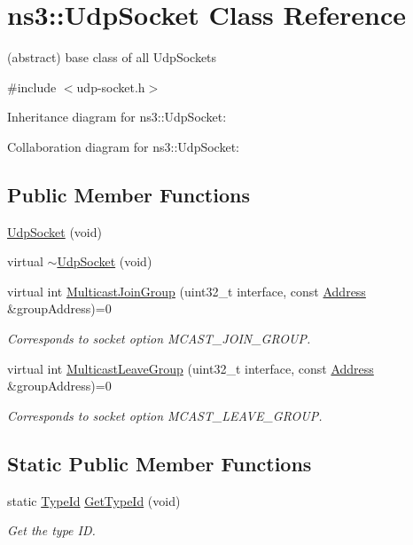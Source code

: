 \hypertarget{classns3_1_1UdpSocket}{}\section{ns3\+:\+:Udp\+Socket Class Reference}
\label{classns3_1_1UdpSocket}


(abstract) base class of all Udp\+Sockets  




{\ttfamily \#include $<$udp-\/socket.\+h$>$}



Inheritance diagram for ns3\+:\+:Udp\+Socket\+:


Collaboration diagram for ns3\+:\+:Udp\+Socket\+:
\subsection*{Public Member Functions}
\begin{DoxyCompactItemize}
\item 
\hyperlink{classns3_1_1UdpSocket_abbf25d1bcbd4a8d344c6266aa8c93bb5}{Udp\+Socket} (void)
\item 
virtual \hyperlink{classns3_1_1UdpSocket_a120729e18bb020caf4878f58171c30ca}{$\sim$\+Udp\+Socket} (void)
\item 
virtual int \hyperlink{classns3_1_1UdpSocket_a3aa48fac00edf4dbd519a6fc7644f0b7}{Multicast\+Join\+Group} (uint32\+\_\+t interface, const \hyperlink{classns3_1_1Address}{Address} \&group\+Address)=0
\begin{DoxyCompactList}\small\item\em Corresponds to socket option M\+C\+A\+S\+T\+\_\+\+J\+O\+I\+N\+\_\+\+G\+R\+O\+UP. \end{DoxyCompactList}\item 
virtual int \hyperlink{classns3_1_1UdpSocket_a27f70e37f597c9ed2c3af66d1a9f330e}{Multicast\+Leave\+Group} (uint32\+\_\+t interface, const \hyperlink{classns3_1_1Address}{Address} \&group\+Address)=0
\begin{DoxyCompactList}\small\item\em Corresponds to socket option M\+C\+A\+S\+T\+\_\+\+L\+E\+A\+V\+E\+\_\+\+G\+R\+O\+UP. \end{DoxyCompactList}\end{DoxyCompactItemize}
\subsection*{Static Public Member Functions}
\begin{DoxyCompactItemize}
\item 
static \hyperlink{classns3_1_1TypeId}{Type\+Id} \hyperlink{classns3_1_1UdpSocket_ad663eeb166a2cbd11a8717a3d09ed3ab}{Get\+Type\+Id} (void)
\begin{DoxyCompactList}\small\item\em Get the type ID. \end{DoxyCompactList}\end{DoxyCompactItemize}
